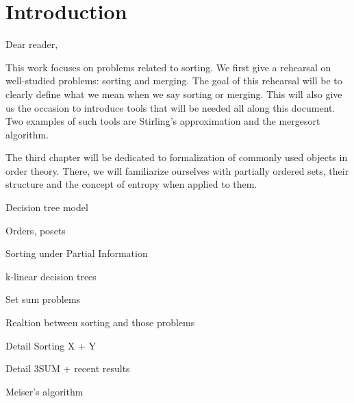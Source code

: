 \setcounter{chapter}{-1}
\chapter{Introduction}

Dear reader,

This work focuses on problems related to sorting. We first give a rehearsal on
well-studied problems: sorting and merging. The goal of this rehearsal will be
to clearly define what we mean when we say sorting or merging. This will also
give us the occasion to introduce tools that will be needed all along this
document. Two examples of such tools are Stirling's approximation and the
mergesort algorithm.

The third chapter will be dedicated to formalization of commonly used objects
in order theory. There, we will familiarize ourselves with partially ordered
sets, their structure and the concept of entropy when applied to them.

Decision tree model

Orders, posets

Sorting under Partial Information

k-linear decision trees

Set sum problems

Realtion between sorting and those problems

Detail Sorting X + Y

Detail 3SUM + recent results

Meiser's algorithm
